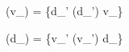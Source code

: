 (v_{\alpha}) = \bigwedge\{d_{\alpha'} \mid {}(d_{\alpha'}) \geq v_{\alpha}\}

(d_{\alpha}) = \bigvee\{v_{\alpha'} \mid {}(v_{\alpha'}) \leq d_{\alpha}\}